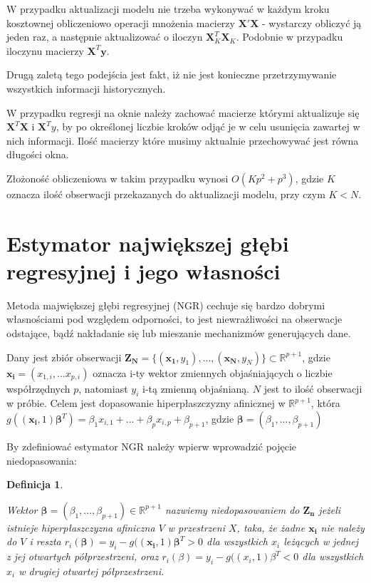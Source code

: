 \documentclass[man,mfu]{mgrwms}
\newtheorem{deff}{Definicja}
\begin{document}
W przypadku aktualizacji modelu nie trzeba wykonywać w każdym kroku kosztownej obliczeniowo operacji mnożenia macierzy $\mathbf{X}'\mathbf{X}$ - wystarczy obliczyć ją jeden raz, a następnie aktualizować o iloczyn $\mathbf{X}_K^T\mathbf{X}_K$. Podobnie w przypadku iloczynu macierzy $\mathbf{X}^T\mathbf{y}$.

Drugą zaletą tego podejścia jest fakt, iż nie jest konieczne przetrzymywanie wszystkich informacji historycznych.


W przypadku regresji na oknie należy zachować macierze którymi aktualizuje się $\mathbf{X}^T\mathbf{X}$ i $\mathbf{X}^Ty$, by po określonej liczbie kroków odjąć je w celu usunięcia zawartej w nich informacji. Ilość macierzy które musimy aktualnie przechowywać jest równa długości okna.

Złożoność obliczeniowa w takim przypadku wynosi $O(Kp^2+p^3)$, gdzie $K$ oznacza ilość obserwacji przekazanych do aktualizacji modelu, przy czym $K<N$.

\section{Estymator największej głębi regresyjnej i jego własności}

Metoda majwiększej głębi regresyjnej (NGR) cechuje się bardzo dobrymi własnościami pod względem odporności, to jest niewrażliwości na obserwacje odstające, bądź nakładanie się lub mieszanie mechanizmów generujących dane\cite{Wielo}.

Dany jest zbiór obserwacji  $\mathbf{Z_N} = \{(\mathbf{x_1},y_1),...,(\mathbf{x_N},y_N)\} \subset \mathbb{R}^{p+1}$, gdzie $\mathbf{x_i} = (x_{1,i},...x_{p,i})$ oznacza i-ty wektor zmiennych objaśniających o liczbie współrzędnych $p$, natomiast $y_i$ i-tą zmienną objaśnianą. $N$ jest to ilość obserwacji w próbie. Celem jest dopasowanie hiperpłaszczyzny afinicznej w $\mathbb{R}^{p+1}$, która $g((\mathbf{x_i},1)\mathbf{\beta}^T) = \beta_1 x_{i,1}+...+\beta_p x_{i,p}+\beta_{p+1}$, gdzie $ \mathbf{\beta} = (\beta_1,...,\beta_{p+1})$

By zdefiniować estymator NGR należy wpierw wprowadzić pojęcie niedopasowania:

\begin{deff}\label{defreg}

Wektor $ \mathbf{\beta} = (\beta_1,...,\beta_{p+1}) \in \mathbb{R}^{p+1}$ nazwiemy niedopasowaniem do $\mathbf{Z_n}$ jeżeli istnieje hiperpłaszczyzna afiniczna $V$ w przestrzeni $X$, taka, że żadne $\mathbf{x_i}$ nie należy do $V$ i reszta $r_i(\mathbf{\beta}) = y_i - g((\mathbf{x_i},1)\mathbf{\beta}^T > 0$ dla wszystkich $x_i$ leżących w jednej z jej otwartych półprzestrzeni, oraz $r_i(\beta) = y_i - g((x_i,1)\beta^T < 0$ dla wszystkich $x_i$ w drugiej otwartej półprzestrzeni.
\end{deff}
\end{document}
